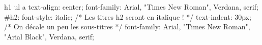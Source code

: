 \documentclass[a4paper]{article}
\begin{document}
\begin{csscode}
h1 ul a
{
	text-align: center;
	font-family: Arial, "Times New Roman", Verdana, serif;
}
#h2:
{
	font-style: italic; /* Les titres h2 seront en italique ! */
	text-indent: 30px; /* On décale un peu les sous-titres */
	font-family: Arial, "Times New Roman", "Arial Black", Verdana, serif;
}
\end{csscode}
\end{document}
